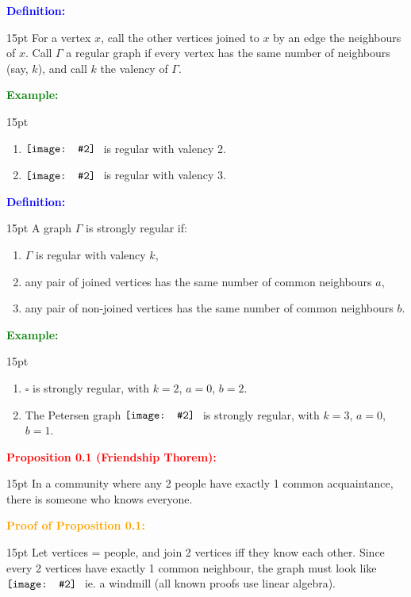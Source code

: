 \documentclass[12pt]{article}
\newcommand{\noparskip}{\vspace{-\parskip}}
\newenvironment{points}
	{\begin{enumerate}[label = (\arabic*)]}
	{\end{enumerate}}
\newenvironment{dent}
	{\begin{adjustwidth}{15pt}{}\noparskip}
	{\end{adjustwidth}}
\newenvironment{result}[1]
	{\textcolor{Red}{\textbf{#1:}}\begin{dent}}
	{\end{dent}}
\newenvironment{proof}[1]
	{\textcolor{Orange}{\textbf{Proof of #1:}}\begin{dent}}
	{\end{dent}}
\newenvironment{definition}
	{\textcolor{Blue}{\textbf{Definition:}}\begin{dent}}
	{\end{dent}}
\newenvironment{example}
	{\textcolor{Green}{\textbf{Example:}}\begin{dent}}
	{\end{dent}}
\newcommand{\pic}[2][1.0]{
	$\vcenter{\hbox{\texttt{[image: \#2]}\ }}$}
\begin{document}
\begin{definition}
For a vertex $x$, call the other vertices joined to $x$ by an edge the neighbours of $x$. Call $\Gamma$ a regular graph if every vertex has the same number of neighbours (say, $k$), and call $k$ the valency of $\Gamma$.
\end{definition}

\begin{example}
\begin{points}
\item \pic[0.15]{2.png} is regular with valency 2.
\item \pic[0.15]{3.png} is regular with valency 3.
\end{points}
\end{example}

\begin{definition}
A graph $\Gamma$ is strongly regular if:
\noparskip
\begin{points}
\item $\Gamma$ is regular with valency $k$,
\item any pair of joined vertices has the same number of common neighbours $a$,
\item any pair of non-joined vertices has the same number of common neighbours $b$.
\end{points}
\end{definition}

\begin{example}
\begin{points}
\item $\square$ is strongly regular, with $k = 2$, $a = 0$, $b = 2$.
\item The Petersen graph \pic[0.15]{4.png} is strongly regular, with $k = 3$, $a = 0$, $b = 1$.
\end{points}
\end{example}

\begin{result}{Proposition 0.1 (Friendship Thorem)}
In a community where any 2 people have exactly 1 common acquaintance, there is someone who knows everyone.
\end{result}

\begin{proof}{Proposition 0.1}
Let vertices = people, and join 2 vertices iff they know each other. Since every 2 vertices have exactly 1 common neighbour, the graph must look like \pic[0.15]{5.png} ie. a windmill (all known proofs use linear algebra).
\end{proof}
\end{document}
